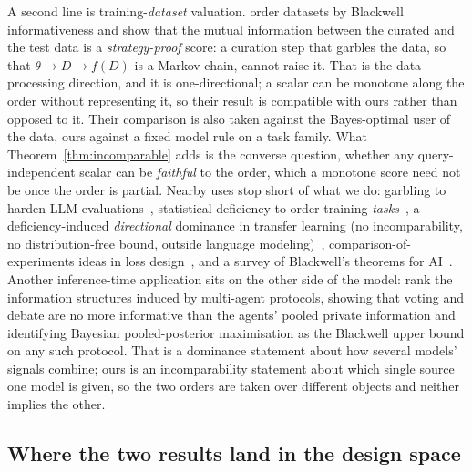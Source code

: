 \documentclass[11pt]{article}
\theoremstyle{plain}
\theoremstyle{definition}
\theoremstyle{remark}
\begin{document}
A second line is training-\emph{dataset} valuation. \citet{zheng2024pmi} order datasets by
Blackwell informativeness and show that the mutual information between the curated and the test
data is a \emph{strategy-proof} score: a curation step that garbles the data, so that
$\theta \to D \to f(D)$ is a Markov chain, cannot raise it. That is the data-processing direction,
and it is one-directional; a scalar can be monotone along the order without representing it, so
their result is compatible with ours rather than opposed to it. Their comparison is also taken
against the Bayes-optimal user of the data, ours against a fixed model rule on a task family. What
Theorem~\ref{thm:incomparable} adds is the converse question, whether any query-independent scalar
can be \emph{faithful} to the order, which a monotone score need not be once the order is partial.
Nearby uses stop short of what we do: garbling to harden LLM
evaluations~\citep{bradley2024garbling}, statistical deficiency to order training
\emph{tasks}~\citep{fosse2025}, a deficiency-induced \emph{directional} dominance in transfer
learning (no incomparability, no distribution-free bound, outside language
modeling)~\citep{akdemir2025}, comparison-of-experiments ideas in loss
design~\citep{vanrooyen2014}, and a survey of Blackwell's theorems for
AI~\citep{blackwellrep2026}. Another inference-time application sits on the other side of the
model: \citet{zhang2026blackwellagents} rank the information structures
induced by multi-agent protocols, showing that voting and debate are no more informative than the
agents' pooled private information and identifying Bayesian pooled-posterior maximisation as the
Blackwell upper bound on any such protocol. That is a dominance statement about how several
models' signals combine; ours is an incomparability statement about which single source one model
is given, so the two orders are taken over different objects and neither implies the other.
\subsection{Where the two results land in the design space}
\label{sec:related-designspace}
\end{document}
